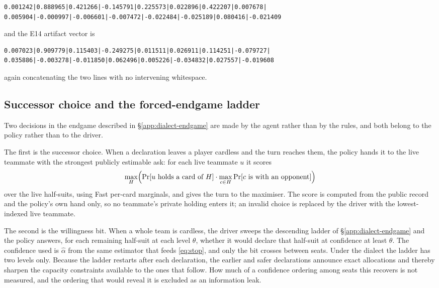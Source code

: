 {\footnotesize
\begin{verbatim}
0.001242|0.888965|0.421266|-0.145791|0.225573|0.022896|0.422207|0.007678|
0.005904|-0.000997|-0.006601|-0.007472|-0.022484|-0.025189|0.080416|-0.021409
\end{verbatim}
}

\noindent and the E14 artifact vector is

{\footnotesize
\begin{verbatim}
0.007023|0.909779|0.115403|-0.249275|0.011511|0.026911|0.114251|-0.079727|
0.035886|-0.003278|-0.011850|0.062496|0.005226|-0.034832|0.027557|-0.019608
\end{verbatim}
}

\noindent again concatenating the two lines with no intervening whitespace.

\subsection{Successor choice and the forced-endgame ladder}
\label{app:params-endgame}

Two decisions in the endgame described in \S\ref{app:dialect-endgame} are made by
the agent rather than by the rules, and both belong to the \vfast{} policy rather
than to the driver.

The first is the successor choice. When a declaration leaves a player cardless
and the turn reaches them, the policy hands it to the live teammate with the
strongest publicly estimable ask: for each live teammate $u$ it scores
\[
  \max_{H} \Bigl( \Pr[u \text{ holds a card of } H] \cdot
  \max_{c \in H} \Pr[c \text{ is with an opponent}] \Bigr)
\]
over the live half-suits, using Fast per-card marginals, and gives the turn to
the maximiser. The score is computed from the public record and the policy's own
hand only, so no teammate's private holding enters it; an invalid choice is
replaced by the driver with the lowest-indexed live teammate.

The second is the willingness bit. When a whole team is cardless, the driver
sweeps the descending ladder of \S\ref{app:dialect-endgame} and the policy
answers, for each remaining half-suit at each level $\theta$, whether it would
declare that half-suit at confidence at least $\theta$. The confidence used is
$\hat\alpha$ from the same estimator that feeds \eqref{eq:stop}, and only the bit
crosses between seats. Under the \vthree{} dialect the ladder has two levels
only. Because the ladder restarts after each declaration, the earlier and safer
declarations announce exact allocations and thereby sharpen the capacity
constraints available to the ones that follow. How much of a confidence ordering
among seats this recovers is not measured, and the ordering that would reveal it
is excluded as an information leak.


